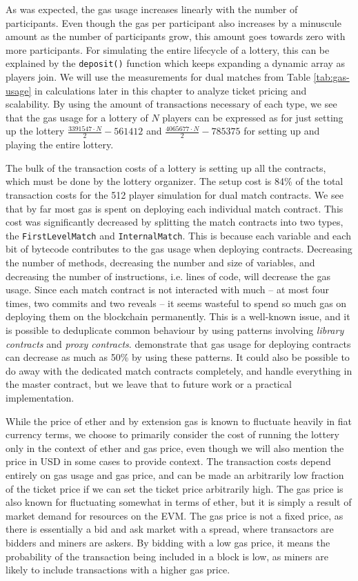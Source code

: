 As was expected, the gas usage increases linearly with the number of participants. Even though the gas per participant also increases by a minuscule amount as the number of participants grow, this amount goes towards zero with more participants. For simulating the entire lifecycle of a lottery, this can be explained by the \texttt{deposit()} function which keeps expanding a dynamic array as players join. We will use the measurements for dual matches from Table \ref{tab:gas-usage} in calculations later in this chapter to analyze ticket pricing and scalability. By using the amount of transactions necessary of each type, we see that the gas usage for a lottery of $N$ players can be expressed as for just setting up the lottery $\frac{3391547 \cdot N}{2} - 561412$ and $\frac{4065677 \cdot N}{2} - 785375$ for setting up and playing the entire lottery.

The bulk of the transaction costs of a lottery is setting up all the contracts, which must be done by the lottery organizer. The setup cost is 84\% of the total transaction costs for the 512 player simulation for dual match contracts. We see that by far most gas is spent on deploying each individual match contract. This cost was significantly decreased by splitting the match contracts into two types, the \texttt{FirstLevelMatch} and \texttt{InternalMatch}. This is because each variable and each bit of bytecode contributes to the gas usage when deploying contracts. Decreasing the number of methods, decreasing the number and size of variables, and decreasing the number of instructions, i.e. lines of code, will decrease the gas usage. Since each match contract is not interacted with much – at most four times, two commits and two reveals – it seems wasteful to spend so much gas on deploying them on the blockchain permanently. This is a well-known issue, and it is possible to deduplicate common behaviour by using patterns involving \emph{library contracts} and \emph{proxy contracts}. \cite{lu_solidity_2018} demonstrate that gas usage for deploying contracts can decrease as much as 50\% by using these patterns. It could also be possible to do away with the dedicated match contracts completely, and handle everything in the master contract, but we leave that to future work or a practical implementation.

While the price of ether and by extension gas is known to fluctuate heavily in fiat currency terms, we choose to primarily consider the cost of running the lottery only in the context of ether and gas price, even though we will also mention the price in USD in some cases to provide context. The transaction costs depend entirely on gas usage and gas price, and can be made an arbitrarily low fraction of the ticket price if we can set the ticket price arbitrarily high. The gas price is also known for fluctuating somewhat in terms of ether, but it is simply a result of market demand for resources on the EVM. The gas price is not a fixed price, as there is essentially a bid and ask market with a spread, where transactors are bidders and miners are askers. By bidding with a low gas price, it means the probability of the transaction being included in a block is low, as miners are likely to include transactions with a higher gas price.

